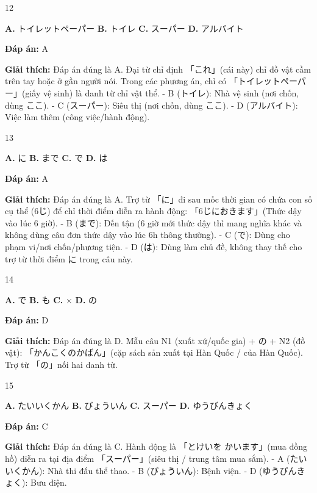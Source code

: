 \documentclass[12pt,a4paper]{report}
\newcommand{\source}[1]{}
\newcommand{\choice}[2]{\textbf{#1.} #2 \quad}
\newcommand{\answer}[1]{\par\textbf{Đáp án:} #1}
\newcommand{\confidence}[1]{}
\newcommand{\explain}[1]{\par\textbf{Giải thích:} #1\vspace{0.5cm}}
\begin{document}
\begin{question}{12}
\source{9.webp}
\choice{A}{トイレットペーパー}
\choice{B}{トイレ}
\choice{C}{スーパー}
\choice{D}{アルバイト}
\answer{A}
\confidence{high}
\explain{Đáp án đúng là A. Đại từ chỉ định 「これ」(cái này) chỉ đồ vật cầm trên tay hoặc ở gần người nói. Trong các phương án, chỉ có 「トイレットペーパー」(giấy vệ sinh) là danh từ chỉ vật thể.
- B (トイレ): Nhà vệ sinh (nơi chốn, dùng ここ).
- C (スーパー): Siêu thị (nơi chốn, dùng ここ).
- D (アルバイト): Việc làm thêm (công việc/hành động).}
\end{question}

\begin{question}{13}
\source{10.webp}
\choice{A}{に}
\choice{B}{まで}
\choice{C}{で}
\choice{D}{は}
\answer{A}
\confidence{high}
\explain{Đáp án đúng là A. Trợ từ 「に」đi sau mốc thời gian có chứa con số cụ thể (6じ) để chỉ thời điểm diễn ra hành động: 「6じにおきます」(Thức dậy vào lúc 6 giờ).
- B (まで): Đến tận (6 giờ mới thức dậy thì mang nghĩa khác và không dùng câu đơn thức dậy vào lúc 6h thông thường).
- C (で): Dùng cho phạm vi/nơi chốn/phương tiện.
- D (は): Dùng làm chủ đề, không thay thế cho trợ từ thời điểm に trong câu này.}
\end{question}

\begin{question}{14}
\source{11.webp}
\choice{A}{で}
\choice{B}{も}
\choice{C}{×}
\choice{D}{の}
\answer{D}
\confidence{high}
\explain{Đáp án đúng là D. Mẫu câu N1 (xuất xứ/quốc gia) + の + N2 (đồ vật): 「かんこくのかばん」(cặp sách sản xuất tại Hàn Quốc / của Hàn Quốc). Trợ từ 「の」nối hai danh từ.}
\end{question}

\begin{question}{15}
\source{14.webp}
\choice{A}{たいいくかん}
\choice{B}{びょういん}
\choice{C}{スーパー}
\choice{D}{ゆうびんきょく}
\answer{C}
\confidence{high}
\explain{Đáp án đúng là C. Hành động là 「とけいを かいます」(mua đồng hồ) diễn ra tại địa điểm 「スーパー」(siêu thị / trung tâm mua sắm).
- A (たいいくかん): Nhà thi đấu thể thao.
- B (びょういん): Bệnh viện.
- D (ゆうびんきょく): Bưu điện.}
\end{question}
\end{document}
